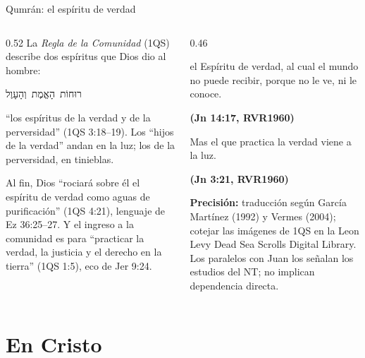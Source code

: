 \documentclass[hyperref={bookmarks=false},aspectratio=169]{beamer}
\newcommand{\heb}[1]{\mbox{\foreignlanguage{hebrew}{#1}}}
\newcommand{\fuente}[1]{\par\hfill{\upshape\bfseries\footnotesize\textcolor{azul}{#1}}}
\newcommand{\precision}[1]{{\footnotesize\color{gris}\textbf{Precisión:} #1}}
\begin{document}
\begin{frame}{Qumrán: el espíritu de verdad}
\begin{columns}[t,onlytextwidth]
\begin{column}{0.52\textwidth}\small
La \emph{Regla de la Comunidad} (1QS) describe dos espíritus que Dios dio al hombre:
\begin{center}\heb{רוּחוֹת הָאֱמֶת וְהָעָוֶל}\end{center}
``los espíritus de la verdad y de la perversidad'' (1QS 3:18--19). Los ``hijos de la verdad'' andan en la luz; los de la perversidad, en tinieblas.\par\smallskip
\scriptsize Al fin, Dios ``rociará sobre él el espíritu de verdad como aguas de purificación'' (1QS 4:21), lenguaje de Ez 36:25--27. Y el ingreso a la comunidad es para ``practicar la verdad, la justicia y el derecho en la tierra'' (1QS 1:5), eco de Jer 9:24.
\end{column}
\begin{column}{0.46\textwidth}
\begin{cita}el Espíritu de verdad, al cual el mundo no puede recibir, porque no le ve, ni le conoce.\fuente{(Jn 14:17, RVR1960)}\end{cita}
\begin{cita}Mas el que practica la verdad viene a la luz.\fuente{(Jn 3:21, RVR1960)}\end{cita}
\precision{traducción según García Martínez (1992) y Vermes (2004); cotejar las imágenes de 1QS en la Leon Levy Dead Sea Scrolls Digital Library. Los paralelos con Juan los señalan los estudios del NT; no implican dependencia directa.}
\end{column}
\end{columns}
\end{frame}

\section{En Cristo}
\end{document}
